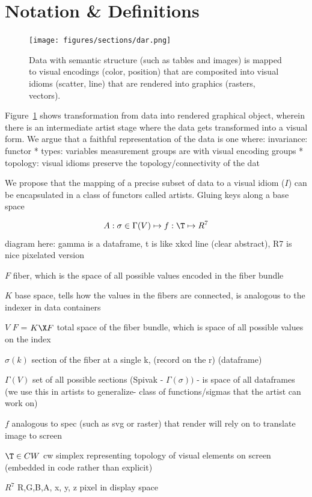 \documentclass[../intro.tex]{subfiles}
\begin{document}
\section{Notation \& Definitions}
\begin{figure}
    \texttt{[image: figures/sections/dar.png]}
    \caption{Data with semantic structure (such as tables and images) is mapped to visual encodings (color, position) that are composited into visual idioms (scatter, line) that are rendered into graphics (rasters, vectors).}
    \label{fig:artists}
\end{figure}
Figure~\ref{fig:artists} shows transformation from data into rendered graphical object, wherein there is an intermediate artist stage where the data gets transformed into a visual form. We argue that a faithful representation of the data is one where:
invariance:
functor
* types: variables measurement groups are  with visual encoding groups
* topology: visual idioms preserve the topology/connectivity of the dat


We propose that the mapping of a precise subset of data to a visual idiom ($I$) can be encapsulated in a class of functors called artists.
Gluing keys along a base space

\begin{equation}
    A: {\sigma \in \Gamma(V)}\mapsto f:\T \mapsto R^{7}
\end{equation}
diagram here: gamma is a dataframe, t is like xkcd line (clear abstract), R7 is nice pixelated version 
\begin{definition}
    \item[$F$] fiber, which is the space of all possible values encoded in the fiber bundle
    \item[$K$] base space, tells how the values in the fibers are connected, is analogous to the indexer in data containers
    \item[$V$] $F$ = $K \X F$ total space of the fiber bundle, which is space of all possible values on the index 
    \item[$\sigma(k)$] section of the fiber at a single k, (record on the  r) (dataframe)
    \item[$\Gamma(V)$] set of all possible sections (Spivak - $\Gamma(\sigma))$ - is space of all dataframes (we use this in artists to generalize- class of functions/sigmas that the artist can work on)
    \item[$f$] analogous to spec (such as svg or raster) that render will rely on to translate image to screen
    \item[$\T \in CW$] cw simplex representing topology of visual elements on screen (embedded in code rather than explicit) 
    \item[$R^{7}$]  {R,G,B,A, x, y, z} pixel in display space
\end{definition}
\end{document}

